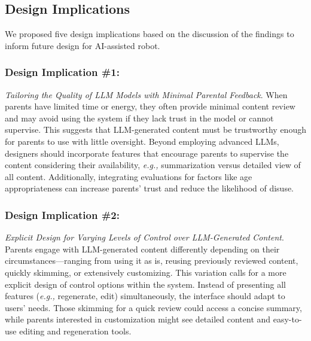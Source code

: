 \subsection{Design Implications} %
We proposed five design implications based on the discussion of the findings to inform future design for AI-assisted robot.

\subsubsection{Design Implication \#1: } \textit{Tailoring the Quality of LLM Models with Minimal Parental Feedback}.  
When parents have limited time or energy, they often provide minimal content review and may avoid using the system if they lack trust in the model or cannot supervise. This suggests that LLM-generated content must be trustworthy enough for parents to use with little oversight. Beyond employing advanced LLMs, designers should incorporate features that encourage parents to supervise the content considering their availability, \textit{e.g.,} summarization versus detailed view of all content. Additionally, integrating evaluations for factors like age appropriateness can increase parents' trust and reduce the likelihood of disuse.

\subsubsection{Design Implication \#2:} \textit{Explicit Design for Varying Levels of Control over LLM-Generated Content}.  
Parents engage with LLM-generated content differently depending on their circumstances—ranging from using it as is, reusing previously reviewed content, quickly skimming, or extensively customizing. This variation calls for a more explicit design of control options within the system. Instead of presenting all features (\textit{e.g.,} regenerate, edit) simultaneously, the interface should adapt to users' needs. Those skimming for a quick review could access a concise summary, while parents interested in customization might see detailed content and easy-to-use editing and regeneration tools.

